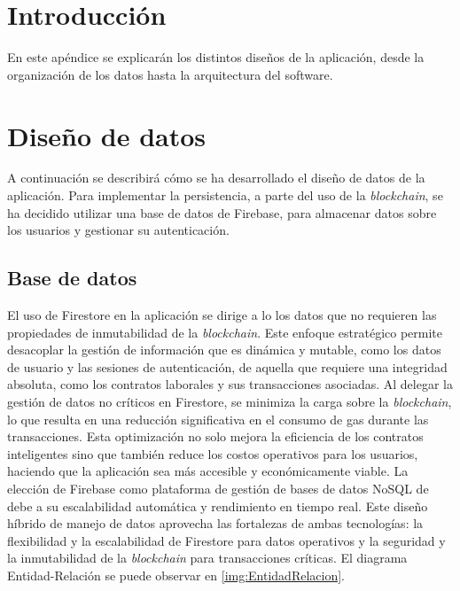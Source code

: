 
\section{Introducción}

En este apéndice se explicarán los distintos diseños de la aplicación, desde la organización de los datos hasta la arquitectura del software.

\section{Diseño de datos}

A continuación se describirá cómo se ha desarrollado el diseño de datos de la aplicación.
Para implementar la persistencia, a parte del uso de la \textit{blockchain}, se ha decidido utilizar una base de datos de Firebase, para almacenar datos sobre los usuarios y gestionar su autenticación.

\subsection{Base de datos}

El uso de Firestore en la aplicación se dirige a lo los datos que no requieren las propiedades de inmutabilidad de la \textit{blockchain}. Este enfoque estratégico permite desacoplar la gestión de información que es dinámica y mutable, como los datos de usuario y las sesiones de autenticación, de aquella que requiere una integridad absoluta, como los contratos laborales y sus transacciones asociadas.
Al delegar la gestión de datos no críticos en Firestore, se minimiza la carga sobre la \textit{blockchain}, lo que resulta en una reducción significativa en el consumo de gas durante las transacciones. Esta optimización no solo mejora la eficiencia de los contratos inteligentes sino que también reduce los costos operativos para los usuarios, haciendo que la aplicación sea más accesible y económicamente viable.
La elección de Firebase como plataforma de gestión de bases de datos NoSQL de debe a su escalabilidad automática y rendimiento en tiempo real.
Este diseño híbrido de manejo de datos aprovecha las fortalezas de ambas tecnologías: la flexibilidad y la escalabilidad de Firestore para datos operativos y la seguridad y la inmutabilidad de la \textit{blockchain} para transacciones críticas. 
El diagrama Entidad-Relación se puede observar en \ref{img:EntidadRelacion}.



